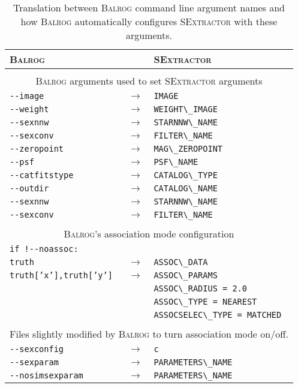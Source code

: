 \documentclass[11pt]{book}
\newcommand{\codett}[1]{\lstinline{#1}}
\newcommand{\balrog}{\textsc{Balrog}}
\newcommand{\sex}{\textsc{SExtractor}}
\newcommand{\opt}[1]{\codett{--#1}}
\begin{document}
\begin{table}[h]
\caption{Translation between \balrog{} command line argument names and how \balrog{} automatically configures
\sex{} with these arguments.} \label{tab:b2s}
\begin{tabular}{l l l} \toprule %

\rowcolor{gray1} \textbf{\balrog{}} & & \textbf{\sex{}} \\ \midrule 
\rowcolor{white} & & \\
\multicolumn{3}{c}{\balrog{} arguments used to set \sex{} arguments} \\
\opt{image} & $\rightarrow$ & \codett{IMAGE} \\
\opt{weight} &  $\rightarrow$ & \codett{WEIGHT\_IMAGE}\\
\opt{sexnnw} & $\rightarrow$ & \codett{STARNNW\_NAME} \\
\opt{sexconv} & $\rightarrow$ & \codett{FILTER\_NAME} \\
\opt{zeropoint} & $\rightarrow$ & \codett{MAG\_ZEROPOINT} \\
\opt{psf} & $\rightarrow$ & \codett{PSF\_NAME} \\
\opt{catfitstype} & $\rightarrow$ & \codett{CATALOG\_TYPE} \\
\opt{outdir} & $\rightarrow$ & \codett{CATALOG\_NAME} \\ 
\opt{sexnnw} & $\rightarrow$ & \codett{STARNNW\_NAME} \\ 
\opt{sexconv} & $\rightarrow$ & \codett{FILTER\_NAME} \\ 

\rowcolor{white} & & \\
\multicolumn{3}{c}{\balrog{}'s association mode configuration} \\
\rowcolor{gray1} \codett{if !--noassoc:} & & \\
\rowcolor{gray1} \texttt{truth} & $\rightarrow$ & \codett{ASSOC\_DATA} \\
\rowcolor{gray1} \texttt{truth['x'],truth['y']} & $\rightarrow$ & \codett{ASSOC\_PARAMS} \\
\rowcolor{gray1} & & \codett{ASSOC\_RADIUS = 2.0} \\
\rowcolor{gray1} & & \codett{ASSOC\_TYPE = NEAREST} \\
\rowcolor{gray1} & & \codett{ASSOCSELEC\_TYPE = MATCHED} \\
\rowcolor{white} & & \\
\multicolumn{3}{c}{Files slightly modified by \balrog{} to turn association mode on/off.} \\
\opt{sexconfig} & $\rightarrow$  &\codett{c} \\
\opt{sexparam} & $\rightarrow$  &\codett{PARAMETERS\_NAME} \\ 
\opt{nosimsexparam} & $\rightarrow$  &\codett{PARAMETERS\_NAME} \\ \bottomrule


\end{tabular}
\end{table}
\end{document}
